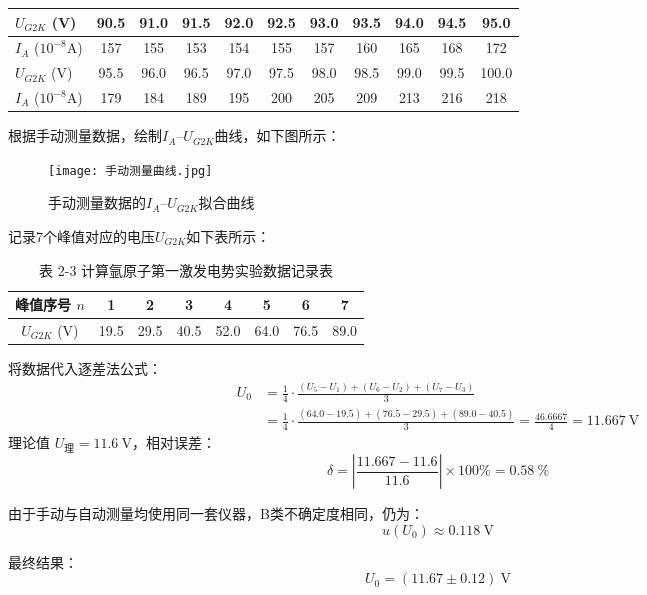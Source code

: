 \documentclass[]{../template/Report}%
\begin{document}
\begin{fullreportonly}
\begin{table}[H]
{\begin{tabular}{|l|*{10}{C|}}
\hline
$U_{G2K}$ (V) & 90.5 & 91.0 & 91.5 & 92.0 & 92.5 & 93.0 & 93.5 & 94.0 & 94.5 & 95.0 \\
\hline
$I_A$ ($10^{-8}$A) & 157 & 155 & 153 & 154 & 155 & 157 & 160 & 165 & 168 & 172 \\
\hline
$U_{G2K}$ (V) & 95.5 & 96.0 & 96.5 & 97.0 & 97.5 & 98.0 & 98.5 & 99.0 & 99.5 & 100.0 \\
\hline
$I_A$ ($10^{-8}$A) & 179 & 184 & 189 & 195 & 200 & 205 & 209 & 213 & 216 & 218 \\
\hline
\end{tabular}
}
\end{table}
根据手动测量数据，绘制$I_A$–$U_{G2K}$曲线，如下图所示：
\begin{figure}[H]
\centering
\texttt{[image: 手动测量曲线.jpg]}
\caption{手动测量数据的$I_A$–$U_{G2K}$拟合曲线}
\label{fig:手动测量曲线}
\end{figure}
记录7个峰值对应的电压$U_{G2K}$如下表所示：
\begin{table}[htbp]
\centering
\caption{表 2-3 计算氩原子第一激发电势实验数据记录表}
\label{tab:argon_excitation_calc}
\begin{tabular}{|c|c|c|c|c|c|c|c|}
\hline
峰值序号 $n$ & 1 & 2 & 3 & 4 & 5 & 6 & 7 \\
\hline
$U_{G2K}$ (V) & 19.5 & 29.5 & 40.5 & 52.0 & 64.0 & 76.5 & 89.0 \\
\hline
\end{tabular}
\end{table}

将数据代入逐差法公式：
\begin{align*}
U_0 &= \frac{1}{4} \cdot \frac{(U_5 - U_1) + (U_6 - U_2) + (U_7 - U_3)}{3}  \\
&= \frac{1}{4}\cdot\frac{(64.0 - 19.5) + (76.5 - 29.5) + (89.0 - 40.5)}{3}
= \frac{46.6667}{4} = \SI{11.667}{\volt}
\end{align*}
理论值 $U_{\text{理}} = \SI{11.6}{\volt}$，相对误差：
\[
\delta = \left| \frac{11.667 - 11.6}{11.6} \right| \times 100\% = \SI{0.58}{\percent}
\]

由于手动与自动测量均使用同一套仪器，B类不确定度相同，仍为：
\[u(U_0)\approx \SI{0.118}{\volt}\]

最终结果：
\[
\boxed{U_0 = (\num{11.67} \pm \num{0.12})~\mathrm{V}}
\]


\end{fullreportonly}
\end{document}
